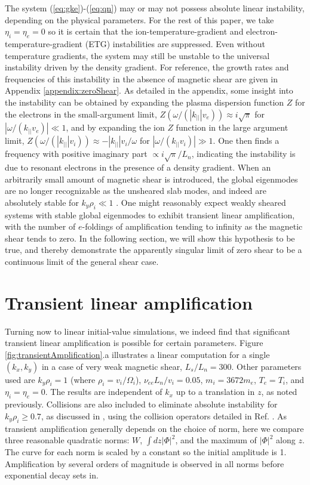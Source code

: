 \documentclass[12pt,superscriptaddress]{revtex4}
\newcommand{\nuee}{\nu_{ee}}
\begin{document}
The system (\ref{eq:gke})-(\ref{eq:qn}) may or may not possess absolute linear instability,
depending on the physical parameters.
For the rest of this paper, we take $\eta_i = \eta_e = 0$
so it is certain that the ion-temperature-gradient and electron-temperature-gradient (ETG)
instabilities are suppressed.
Even without temperature gradients, the system may still be unstable to the universal instability
driven by the density gradient.
For reference, the growth rates and frequencies of this instability
in the absence of magnetic shear are given in Appendix \ref{appendix:zeroShear}.
As detailed in the appendix, some insight into the instability can be obtained by expanding
the plasma dispersion function $Z$ for the electrons in the small-argument limit,
$Z(\omega / (|k_{||}| v_e)) \approx i \sqrt{\pi}$ for $|\omega / (k_{||} v_e)| \ll 1$,
and by expanding the ion $Z$ function in the large argument limit,
$Z(\omega / (|k_{||}| v_i)) \approx - |k_{||}| v_i / \omega$ for $|\omega / (k_{||} v_i)| \gg 1$.
One then finds a frequency with positive imaginary part $\propto i \sqrt{\pi} / L_n$,
indicating the instability is due to resonant electrons in the presence of a density gradient.
When an arbitrarily small amount of magnetic shear is introduced, the global eigenmodes are
no longer recognizable as the unsheared slab modes, and indeed are absolutely stable
for $k_y\rho_i \ll 1$ \cite{Ross,Tsang}.  One might reasonably expect weakly sheared systems with
stable global eigenmodes to exhibit transient linear amplification, with the number of $e$-foldings
of amplification tending to infinity as the magnetic shear tends to zero.  In the following section,
we will show this hypothesis to be true, and thereby demonstrate the apparently singular limit of zero shear
to be a continuous limit of the general shear case.


\section{Transient linear amplification}
\label{sec:transient}

Turning now to linear initial-value simulations,
we indeed find that significant transient linear amplification is possible for certain parameters.
Figure \ref{fig:transientAmplification}.a illustrates
a linear computation for a single $(k_x,k_y)$ in a case of very weak magnetic shear, $L_s / L_n = 300$.
Other parameters used are $k_y \rho_i = 1$ (where  $\rho_i = v_i / \Omega_i$), $\nuee L_n / v_i = 0.05$,
$m_i = 3672 m_e$,
$T_e = T_i$, and $\eta_i = \eta_e = 0$.
The results are independent of $k_x$ up to a translation in $z$, as noted previously.
Collisions are also included to eliminate absolute instability for $k_y \rho_i \ge 0.7$,
as discussed in \cite{usUniversalInstability},
using the collision operators detailed in Ref. \cite{Abel}.
As transient amplification generally depends on the choice
of norm, here we compare three reasonable quadratic norms: $W$, $\int dz |\Phi|^2$,
and the maximum of $|\Phi|^2$ along $z$.
The curve for each norm is scaled by a constant so the initial amplitude is 1.
Amplification by several orders of magnitude is observed in all norms
before exponential decay sets in.
\end{document}
